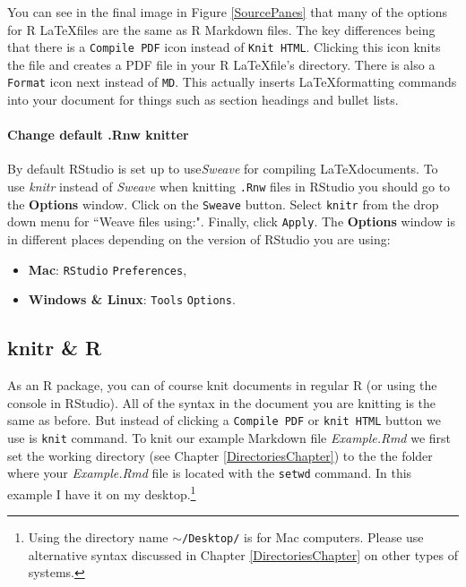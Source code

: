 \documentclass[ChapterTOCs,krantz1]{krantz}\usepackage{graphicx, color}
\begin{document}
{{You can see in the final image in Figure \ref{SourcePanes} that many of the options for R \LaTeX files are the same as R Markdown files. The key differences being that there is a \texttt{Compile PDF} icon instead of \texttt{Knit HTML}. Clicking this icon knits the file and creates a PDF file in your R \LaTeX file's directory. There is also a \texttt{Format} icon next instead of \texttt{MD}. This actually inserts \LaTeX formatting commands into your document for things such as section headings and bullet lists.


\paragraph{Change default .Rnw knitter}
By default RStudio is set up to use{\emph{Sweave}} for compiling \LaTeX documents. To use {\emph{knitr}} instead of {\emph{Sweave}} when knitting \texttt{.Rnw} files in RStudio you should go to the {\bf{Options}} window. Click on the \texttt{Sweave} button. Select \texttt{knitr} from the drop down menu for ``Weave files using:". Finally, click \texttt{Apply}. The {\bf{Options}} window is in different places depending on the version of RStudio you are using:

    \begin{itemize}
        \item {\bf{Mac}}: \texttt{RStudio} \textrightarrow\; \texttt{Preferences},
        \item {\bf{Windows \& Linux}}: \texttt{Tools} \textrightarrow\; \texttt{Options}.
    \end{itemize}

\subsection{knitr \& R}

As an R package, you can of course knit documents in regular R (or using the console in RStudio). All of the syntax in the document you are knitting is the same as before. But instead of clicking a {\tt{Compile PDF}} or {\tt{knit HTML}} button we use is {\tt{knit}} command. To knit our example Markdown file {\emph{Example.Rmd}} we first set the working directory (see Chapter \ref{DirectoriesChapter}) to the the folder where your {\emph{Example.Rmd}} file is located with the {\tt{setwd}} command. In this example I have it on my desktop.\footnote{Using the directory name {\tt{$\sim$/Desktop/}} is for Mac computers. Please use alternative syntax discussed in Chapter \ref{DirectoriesChapter} on other types of systems.}

}}
\end{document}
